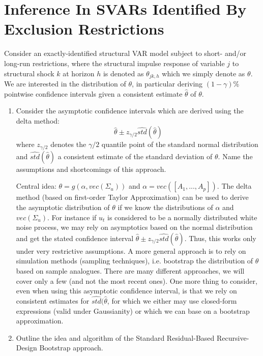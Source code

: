 \documentclass[a4paper]{scrartcl}
\begin{document}
    \section{Inference In SVARs Identified By Exclusion Restrictions}
    Consider an exactly-identified structural VAR model subject to short- and/or long-run restrictions, where the structural impulse response of variable $j$ to structural shock $k$ at horizon $h$ is denoted as $\theta_{jk,h}$ which we simply denote as $\theta$. We are interested in the distribution of $\theta$, in particular deriving $(1-\gamma)\%$ pointwise confidence intervals given a consistent estimate $\hat{\theta}$ of $\theta$.
    \begin{enumerate}	
        \item Consider the asymptotic confidence intervals which are derived using the delta method: $$\hat{\theta} \pm z_{\gamma/2} \widehat{std}(\hat{\theta})$$ where $z_{\gamma/2}$ denotes the $\gamma/2$ quantile point of the standard normal distribution and $ \widehat{std}(\hat{\theta})$ a consistent estimate of the standard deviation of $\theta$. Name the assumptions and shortcomings of this approach.
              \begin{solution}
                  Central idea: $\theta = g(\alpha,vec(\Sigma_u))$ and $\alpha = vec([A_1,...,A_p])$. The delta method (based on first-order Taylor Approximation) can be used to derive the asymptotic distribution of $\theta$ if we know the distributions of $\alpha$ and $vec(\Sigma_u)$. For instance if $u_t$ is considered to be a normally distributed white noise process, we may rely on asymptotics based on the normal distribution and get the stated confidence interval $\hat{\theta} \pm z_{\gamma/2} \widehat{std}(\hat{\theta})$. Thus, this works only under very restrictive assumptions. A more general approach is to rely on simulation methods (sampling techniques), i.e. bootstrap the distribution of $\theta$ based on sample analogues. There are many different approaches, we will cover only a few (and not the most recent ones). One more thing to consider, even when using this asymptotic confidence interval, is that we rely on consistent estimates for $\widehat{std}(\hat{\theta}$, for which we either may use closed-form expressions (valid under Gaussianity) or which we can base on a bootstrap approximation.
              \end{solution}
        \item Outline the idea and algorithm of the Standard Residual-Based Recursive-Design Bootstrap approach.
              \begin{solution}

\end{solution}
\end{enumerate}
\end{document}
